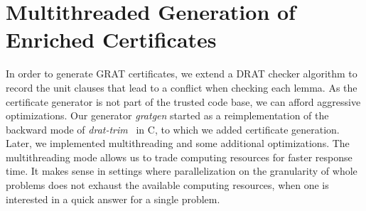 \documentclass[smallcondensed]{svjour3}     %
\newcommand\CC{C\nolinebreak[4]\hspace{-.05em}\raisebox{.4ex}{\relsize{-3}{\textbf{++}}}}
\begin{document}
%     
%   
%   
%       
%       
%     
%     
    
\section{Multithreaded Generation of Enriched Certificates}\label{sec:gratgen}
In order to generate GRAT certificates, we extend a DRAT checker algorithm 
to record the unit clauses that lead to a conflict when checking each lemma. 
As the certificate generator is not part of the trusted code base, we can afford aggressive optimizations.
Our generator {\sl gratgen} started as a reimplementation of the backward mode of {\sl drat-trim}~\cite{WHH13,drat-trim-webpage} in \CC, to 
which we added certificate generation. Later, we implemented multithreading and some additional optimizations.
The multithreading mode allows us to trade computing resources for faster response time. It makes sense in settings where parallelization 
on the granularity of whole problems does not exhaust the available computing resources, \eg when one is interested in a quick answer for a single problem.
\end{document}
